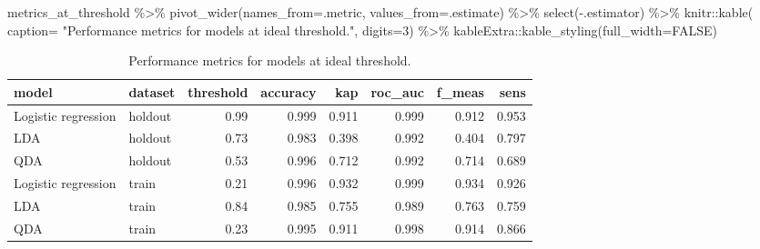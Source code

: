 \documentclass[
]{article}
\newenvironment{Shaded}{\begin{snugshade}}{\end{snugshade}}
\newcommand{\AttributeTok}[1]{\textcolor[rgb]{0.77,0.63,0.00}{#1}}
\newcommand{\ConstantTok}[1]{\textcolor[rgb]{0.00,0.00,0.00}{#1}}
\newcommand{\DecValTok}[1]{\textcolor[rgb]{0.00,0.00,0.81}{#1}}
\newcommand{\FunctionTok}[1]{\textcolor[rgb]{0.00,0.00,0.00}{#1}}
\newcommand{\NormalTok}[1]{#1}
\newcommand{\SpecialCharTok}[1]{\textcolor[rgb]{0.00,0.00,0.00}{#1}}
\newcommand{\StringTok}[1]{\textcolor[rgb]{0.31,0.60,0.02}{#1}}
\begin{document}
\begin{Shaded}
\begin{Highlighting}[]
\NormalTok{metrics\_at\_threshold }\SpecialCharTok{\%\textgreater{}\%}
        \FunctionTok{pivot\_wider}\NormalTok{(}\AttributeTok{names\_from=}\NormalTok{.metric, }\AttributeTok{values\_from=}\NormalTok{.estimate) }\SpecialCharTok{\%\textgreater{}\%}
        \FunctionTok{select}\NormalTok{(}\SpecialCharTok{{-}}\NormalTok{.estimator) }\SpecialCharTok{\%\textgreater{}\%}
\NormalTok{        knitr}\SpecialCharTok{::}\FunctionTok{kable}\NormalTok{(}
          \AttributeTok{caption=} \StringTok{"Performance metrics for models at ideal threshold."}\NormalTok{, }
          \AttributeTok{digits=}\DecValTok{3}\NormalTok{) }\SpecialCharTok{\%\textgreater{}\%}
\NormalTok{        kableExtra}\SpecialCharTok{::}\FunctionTok{kable\_styling}\NormalTok{(}\AttributeTok{full\_width=}\ConstantTok{FALSE}\NormalTok{)}
\end{Highlighting}
\end{Shaded}

\begin{longtable}[t]{llrrrrrr}
\caption{\label{tab:model eval table}Performance metrics for models at ideal threshold.}\\
\toprule
model & dataset & threshold & accuracy & kap & roc\_auc & f\_meas & sens\\
\midrule
Logistic regression & holdout & 0.99 & 0.999 & 0.911 & 0.999 & 0.912 & 0.953\\
LDA & holdout & 0.73 & 0.983 & 0.398 & 0.992 & 0.404 & 0.797\\
QDA & holdout & 0.53 & 0.996 & 0.712 & 0.992 & 0.714 & 0.689\\
Logistic regression & train & 0.21 & 0.996 & 0.932 & 0.999 & 0.934 & 0.926\\
LDA & train & 0.84 & 0.985 & 0.755 & 0.989 & 0.763 & 0.759\\
\addlinespace
QDA & train & 0.23 & 0.995 & 0.911 & 0.998 & 0.914 & 0.866\\
\bottomrule
\end{longtable}
\end{document}
